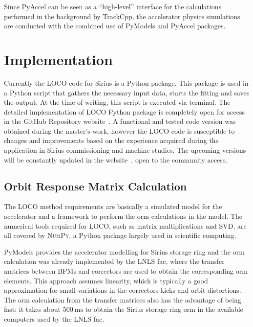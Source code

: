 Since PyAccel can be seen as a ``high-level'' interface for the calculations performed in the background by TrackCpp, the accelerator physics simulations are conducted with the combined use of PyModels and PyAccel packages.
\section{Implementation}

Currently the LOCO code for Sirius is a Python package. This package is used in a Python script that gathers the necessary input data, starts the fitting and saves the output. At the time of writing, this script is executed via terminal. The detailed implementation of LOCO Python package is completely open for access in the GitHub Repository website~\cite{locosirius}. A functional and tested code version was obtained during the master's work, however the LOCO code is susceptible to changes and improvements based on the experience acquired during the application in Sirius commissioning and machine studies. The upcoming versions will be constantly updated in the website~\cite{locosirius}, open to the community access.

\subsection{Orbit Response Matrix Calculation}
The LOCO method requirements are basically a simulated model for the accelerator and a framework to perform the \gls{orm} calculations in the model. The numerical tools required for LOCO, such as matrix multiplications and SVD, are all covered by \textsc{NumPy}, a Python package largely used in scientific computing. 

PyModels provides the accelerator modelling for Sirius storage ring and the \gls{orm} calculation was already implemented by the LNLS \gls{fac}, where the transfer matrices between BPMs and correctors are used to obtain the corresponding \gls{orm} elements. This approach assumes linearity, which is typically a good approximation for small variations in the correctors kicks and orbit distortions. The \gls{orm} calculation from the transfer matrices also has the advantage of being fast: it takes about $\SI{500}{\milli\second}$ to obtain the Sirius storage ring \gls{orm} in the available computers used by the LNLS \gls{fac}.

